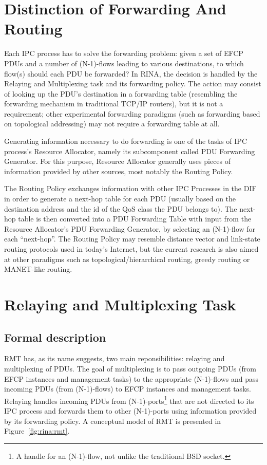     \section{Distinction of Forwarding And Routing}

        Each IPC process has to solve the forwarding problem: given a set of EFCP PDUs and a number of (N-1)-flows leading to various destinations, to which flow(s) should each PDU be forwarded? In RINA, the decision is handled by the Relaying and Multiplexing task and its forwarding policy. The action may consist of looking up the PDU's destination in a forwarding table (resembling the forwarding mechanism in traditional TCP/IP routers), but it is not a requirement; other experimental forwarding paradigms (such as forwarding based on topological addressing) may not require a forwarding table at all.

        Generating information necessary to do forwarding is one of the tasks of IPC process's Resource Allocator, namely its subcomponent called PDU Forwarding Generator. For this purpose, Resource Allocator generally uses pieces of information provided by other sources, most notably the Routing Policy.

        The Routing Policy exchanges information with other IPC Processes in the DIF in order to generate a next-hop table for each PDU (usually based on the destination address and the id of the QoS class the PDU belongs to). The next-hop table is then converted into a PDU Forwarding Table with input from the Resource Allocator's PDU Forwarding Generator, by selecting an (N-1)-flow for each ``next-hop''. The Routing Policy may resemble distance vector and link-state routing protocols used in today's Internet, but the current research is also aimed at other paradigms such as topological/hierarchical routing, greedy routing or MANET-like routing.


    \section{Relaying and Multiplexing Task}

        \subsection{Formal description}

            RMT has, as its name suggests, two main reponsibilities: relaying and multiplexing of PDUs. The goal of multiplexing is to pass outgoing PDUs (from EFCP instances and management tasks) to the appropriate (N-1)-flows and pass incoming PDUs (from (N-1)-flows) to EFCP instances and management tasks. Relaying handles incoming PDUs from (N-1)-ports\footnote{A handle for an (N-1)-flow, not unlike the traditional BSD socket.} that are not directed to its IPC process and forwards them to other (N-1)-ports using information provided by its forwarding policy. A conceptual model of RMT is presented in Figure~\ref{fig:rina:rmt}.

